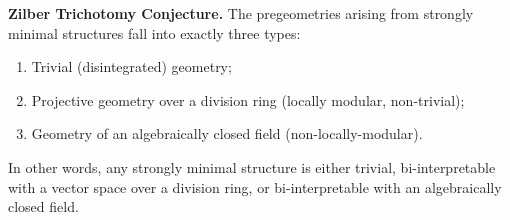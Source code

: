 \textbf{Zilber Trichotomy Conjecture.} The pregeometries arising from strongly minimal structures fall into exactly three types:
\begin{enumerate}
\item[(1)] Trivial (disintegrated) geometry;
\item[(2)] Projective geometry over a division ring (locally modular, non-trivial);
\item[(3)] Geometry of an algebraically closed field (non-locally-modular).
\end{enumerate}

In other words, any strongly minimal structure is either trivial, bi-interpretable with a vector space over a division ring, or bi-interpretable with an algebraically closed field.
